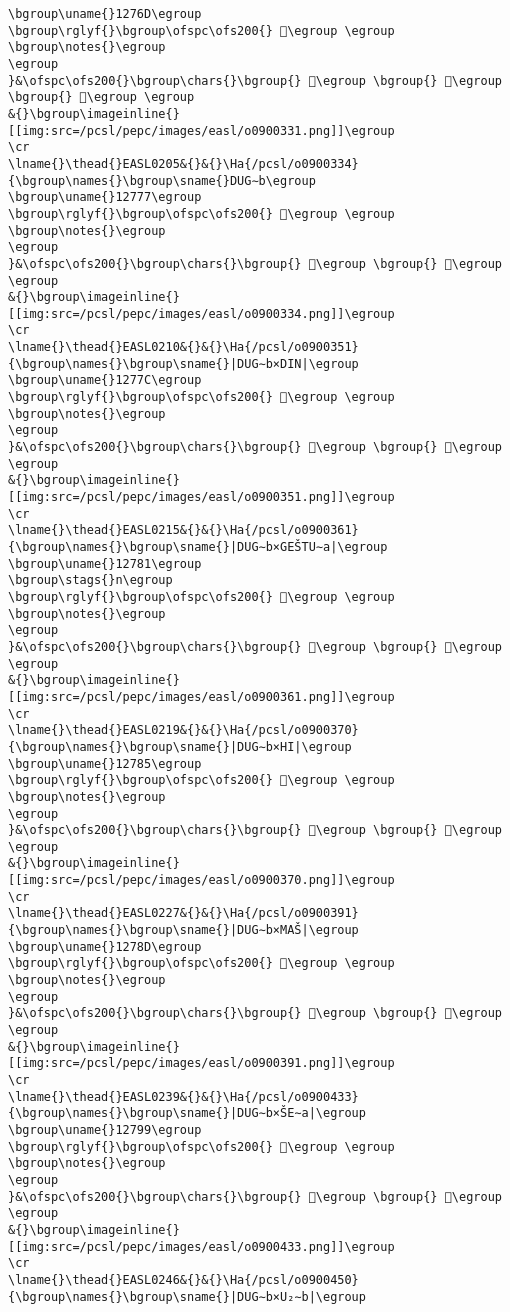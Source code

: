 \begin{verbatim}
\bgroup\uname{}1276D\egroup
\bgroup\rglyf{}\bgroup\ofspc\ofs200{} 𒝭\egroup \egroup
\bgroup\notes{}\egroup
\egroup
}&\ofspc\ofs200{}\bgroup\chars{}\bgroup{} 𒝶\egroup \bgroup{} 𒝵\egroup \bgroup{} 𒝭\egroup \egroup
&{}\bgroup\imageinline{}[[img:src=/pcsl/pepc/images/easl/o0900331.png]]\egroup
\cr
\lname{}\thead{}EASL0205&{}&{}\Ha{/pcsl/o0900334}{\bgroup\names{}\bgroup\sname{}DUG∼b\egroup
\bgroup\uname{}12777\egroup
\bgroup\rglyf{}\bgroup\ofspc\ofs200{} 𒝷\egroup \egroup
\bgroup\notes{}\egroup
\egroup
}&\ofspc\ofs200{}\bgroup\chars{}\bgroup{} 𒞭\egroup \bgroup{} 𒝷\egroup \egroup
&{}\bgroup\imageinline{}[[img:src=/pcsl/pepc/images/easl/o0900334.png]]\egroup
\cr
\lname{}\thead{}EASL0210&{}&{}\Ha{/pcsl/o0900351}{\bgroup\names{}\bgroup\sname{}|DUG∼b×DIN|\egroup
\bgroup\uname{}1277C\egroup
\bgroup\rglyf{}\bgroup\ofspc\ofs200{} 𒝼\egroup \egroup
\bgroup\notes{}\egroup
\egroup
}&\ofspc\ofs200{}\bgroup\chars{}\bgroup{} 𒞯\egroup \bgroup{} 𒝼\egroup \egroup
&{}\bgroup\imageinline{}[[img:src=/pcsl/pepc/images/easl/o0900351.png]]\egroup
\cr
\lname{}\thead{}EASL0215&{}&{}\Ha{/pcsl/o0900361}{\bgroup\names{}\bgroup\sname{}|DUG∼b×GEŠTU∼a|\egroup
\bgroup\uname{}12781\egroup
\bgroup\stags{}n\egroup
\bgroup\rglyf{}\bgroup\ofspc\ofs200{} 𒞁\egroup \egroup
\bgroup\notes{}\egroup
\egroup
}&\ofspc\ofs200{}\bgroup\chars{}\bgroup{} 𒞰\egroup \bgroup{} 𒞁\egroup \egroup
&{}\bgroup\imageinline{}[[img:src=/pcsl/pepc/images/easl/o0900361.png]]\egroup
\cr
\lname{}\thead{}EASL0219&{}&{}\Ha{/pcsl/o0900370}{\bgroup\names{}\bgroup\sname{}|DUG∼b×HI|\egroup
\bgroup\uname{}12785\egroup
\bgroup\rglyf{}\bgroup\ofspc\ofs200{} 𒞅\egroup \egroup
\bgroup\notes{}\egroup
\egroup
}&\ofspc\ofs200{}\bgroup\chars{}\bgroup{} 𒞱\egroup \bgroup{} 𒞅\egroup \egroup
&{}\bgroup\imageinline{}[[img:src=/pcsl/pepc/images/easl/o0900370.png]]\egroup
\cr
\lname{}\thead{}EASL0227&{}&{}\Ha{/pcsl/o0900391}{\bgroup\names{}\bgroup\sname{}|DUG∼b×MAŠ|\egroup
\bgroup\uname{}1278D\egroup
\bgroup\rglyf{}\bgroup\ofspc\ofs200{} 𒞍\egroup \egroup
\bgroup\notes{}\egroup
\egroup
}&\ofspc\ofs200{}\bgroup\chars{}\bgroup{} 𒞳\egroup \bgroup{} 𒞍\egroup \egroup
&{}\bgroup\imageinline{}[[img:src=/pcsl/pepc/images/easl/o0900391.png]]\egroup
\cr
\lname{}\thead{}EASL0239&{}&{}\Ha{/pcsl/o0900433}{\bgroup\names{}\bgroup\sname{}|DUG∼b×ŠE∼a|\egroup
\bgroup\uname{}12799\egroup
\bgroup\rglyf{}\bgroup\ofspc\ofs200{} 𒞙\egroup \egroup
\bgroup\notes{}\egroup
\egroup
}&\ofspc\ofs200{}\bgroup\chars{}\bgroup{} 𒞴\egroup \bgroup{} 𒞙\egroup \egroup
&{}\bgroup\imageinline{}[[img:src=/pcsl/pepc/images/easl/o0900433.png]]\egroup
\cr
\lname{}\thead{}EASL0246&{}&{}\Ha{/pcsl/o0900450}{\bgroup\names{}\bgroup\sname{}|DUG∼b×U₂∼b|\egroup

\end{verbatim}
